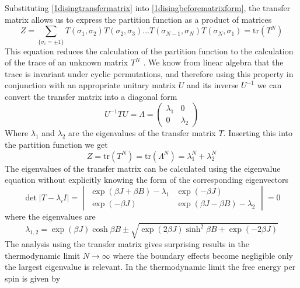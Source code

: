 %
Substituting \eqref{1disingtransfermatrix} into \eqref{1disingbeforematrixform}, the transfer matrix allows us to express the partition function  as a product of matrices \cite{Yeomans1992}
%
\begin{equation}
Z=\sum_{\{\sigma_{i}=\pm1\}}T\left(\sigma_{1},\sigma_{2}\right)T\left(\sigma_{2},\sigma_{3}\right)...T\left(\sigma_{N-1},\sigma_{N}\right)T\left(\sigma_{N},\sigma_{1}\right)=\mbox{tr}\left( T^{N}\right)
\end{equation}
%
This equation reduces the calculation of the partition function to the calculation of the trace of an unknown matrix $T^{N}$ . We know from linear algebra that the trace is invariant under cyclic permutations, and therefore using this property in conjunction with an appropriate unitary matrix $U$ and its inverse $U^{-1}$ we can convert the transfer matrix into a diagonal form
%
\begin{equation}
U^{-1}TU= \Lambda =\begin{pmatrix}
\lambda_1 & 0 \\ 
0 & \lambda_2 
\end{pmatrix}
\end{equation}
%
Where $\lambda_1$ and $\lambda_2$ are the eigenvalues of the transfer matrix $T$. Inserting this into the partition function we get
%
\begin{equation}
Z=\mbox{tr}\left(T^{N}\right) = \mbox{tr}\left(\Lambda^{N}\right) = \lambda_1^{N} + \lambda_2^{N}
\end{equation}
%
The eigenvalues of the transfer matrix can be calculated using the eigenvalue equation without explicitly knowing the form of the corresponding eigenvectors
%
\begin{equation}
\det \left| T-\lambda_{i}I\right| =
\begin{vmatrix}
\exp\left(\beta J+\beta B\right)-\lambda_1 & \exp\left(-\beta J \right) \\ \exp\left(-\beta J \right) & \exp\left(\beta J-\beta B\right)-\lambda_2 
\end{vmatrix}=0
\end{equation}
%
where the eigenvalues are \cite{Plischke2006,Yeomans1992}
%
\begin{equation}
\lambda_{1,2}=\exp\left( \beta J \right)\cosh \beta B\pm\sqrt{ \exp\left(2 \beta J\right)\sinh^{2}\beta B + \exp\left(-2\beta J\right)}
\end{equation}
%
The analysis using the transfer matrix gives surprising results in the thermodynamic limit $N \to \infty$ where the boundary effects become negligible only the largest eigenvalue is relevant. In the thermodynamic limit the free energy per spin is given by
